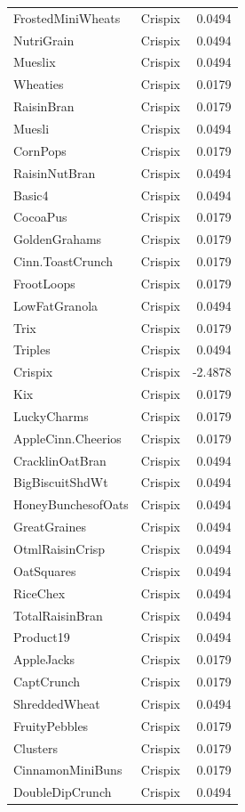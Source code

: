 \begin{longtable}{llr}
FrostedMiniWheats & Crispix & 0.0494 \\
NutriGrain & Crispix & 0.0494 \\
Mueslix & Crispix & 0.0494 \\
Wheaties & Crispix & 0.0179 \\
RaisinBran & Crispix & 0.0179 \\
Muesli & Crispix & 0.0494 \\
CornPops & Crispix & 0.0179 \\
RaisinNutBran & Crispix & 0.0494 \\
Basic4 & Crispix & 0.0494 \\
CocoaPus & Crispix & 0.0179 \\
GoldenGrahams & Crispix & 0.0179 \\
Cinn.ToastCrunch & Crispix & 0.0179 \\
FrootLoops & Crispix & 0.0179 \\
LowFatGranola & Crispix & 0.0494 \\
Trix & Crispix & 0.0179 \\
Triples & Crispix & 0.0494 \\
Crispix & Crispix & -2.4878 \\
Kix & Crispix & 0.0179 \\
LuckyCharms & Crispix & 0.0179 \\
AppleCinn.Cheerios & Crispix & 0.0179 \\
CracklinOatBran & Crispix & 0.0494 \\
BigBiscuitShdWt & Crispix & 0.0494 \\
HoneyBunchesofOats & Crispix & 0.0494 \\
GreatGraines & Crispix & 0.0494 \\
OtmlRaisinCrisp & Crispix & 0.0494 \\
OatSquares & Crispix & 0.0494 \\
RiceChex & Crispix & 0.0494 \\
TotalRaisinBran & Crispix & 0.0494 \\
Product19 & Crispix & 0.0494 \\
AppleJacks & Crispix & 0.0179 \\
CaptCrunch & Crispix & 0.0179 \\
ShreddedWheat & Crispix & 0.0494 \\
FruityPebbles & Crispix & 0.0179 \\
Clusters & Crispix & 0.0179 \\
CinnamonMiniBuns & Crispix & 0.0179 \\
DoubleDipCrunch & Crispix & 0.0494 \\

\end{longtable}

